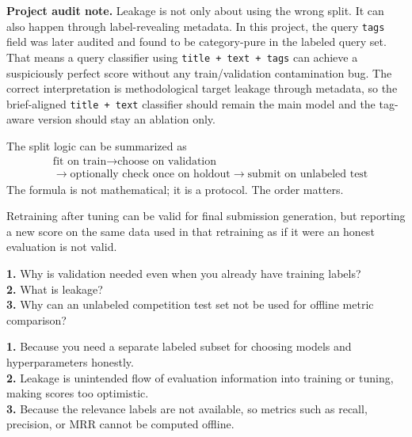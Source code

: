 \documentclass[11pt,oneside]{report}
\newcommand{\code}[1]{\texttt{#1}}
\begin{document}
\begin{warningbox}
\textbf{Project audit note.} Leakage is not only about using the wrong split. It can also happen through label-revealing metadata. In this project, the query \code{tags} field was later audited and found to be category-pure in the labeled query set. That means a query classifier using \code{title + text + tags} can achieve a suspiciously perfect score without any train/validation contamination bug. The correct interpretation is methodological target leakage through metadata, so the brief-aligned \code{title + text} classifier should remain the main model and the tag-aware version should stay an ablation only.
\end{warningbox}

\begin{formulabox}
The split logic can be summarized as
\[
\begin{aligned}
&\text{fit on train} \rightarrow \text{choose on validation}\\
&\rightarrow \text{optionally check once on holdout} \rightarrow \text{submit on unlabeled test}
\end{aligned}
\]
The formula is not mathematical; it is a protocol. The order matters.
\end{formulabox}

\begin{warningbox}
Retraining after tuning can be valid for final submission generation, but reporting a new score on the same data used in that retraining as if it were an honest evaluation is not valid.
\end{warningbox}

\begin{selfcheckbox}
\textbf{1.} Why is validation needed even when you already have training labels?\\
\textbf{2.} What is leakage?\\
\textbf{3.} Why can an unlabeled competition test set not be used for offline metric comparison?
\end{selfcheckbox}

\begin{answerbox}
\textbf{1.} Because you need a separate labeled subset for choosing models and hyperparameters honestly.\\
\textbf{2.} Leakage is unintended flow of evaluation information into training or tuning, making scores too optimistic.\\
\textbf{3.} Because the relevance labels are not available, so metrics such as recall, precision, or MRR cannot be computed offline.
\end{answerbox}
\end{document}
